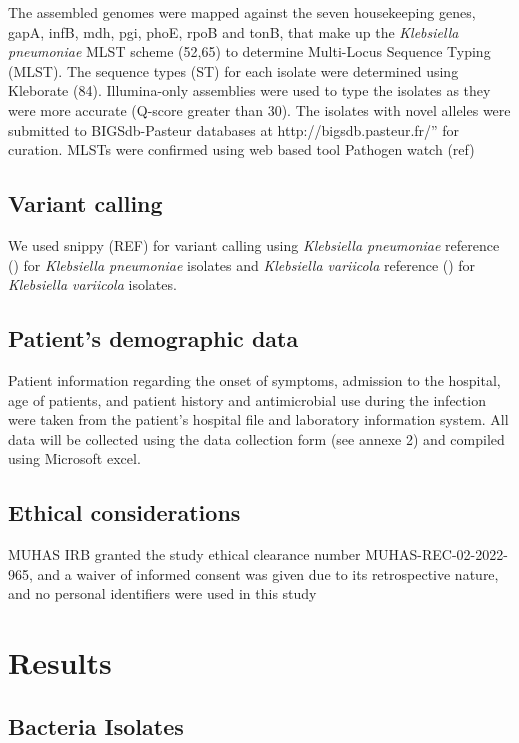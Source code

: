 \documentclass[preprint, 3p,
authoryear]{elsarticle} %
\begin{document}
The assembled genomes were mapped against the seven housekeeping genes,
gapA, infB, mdh, pgi, phoE, rpoB and tonB, that make up the
\emph{Klebsiella pneumoniae} MLST scheme (52,65) to determine
Multi-Locus Sequence Typing (MLST). The sequence types (ST) for each
isolate were determined using Kleborate (84). Illumina-only assemblies
were used to type the isolates as they were more accurate (Q-score
greater than 30). The isolates with novel alleles were submitted to
BIGSdb-Pasteur databases at http://bigsdb.pasteur.fr/'' for curation.
MLSTs were confirmed using web based tool Pathogen watch (ref)

\subsection{Variant calling}\label{variant-calling}

We used snippy (REF) for variant calling using \emph{Klebsiella
pneumoniae} reference () for \emph{Klebsiella pneumoniae} isolates and
\emph{Klebsiella variicola} reference () for \emph{Klebsiella variicola}
isolates.

\subsection{Patient's demographic data}\label{patients-demographic-data}

Patient information regarding the onset of symptoms, admission to the
hospital, age of patients, and patient history and antimicrobial use
during the infection were taken from the patient's hospital file and
laboratory information system. All data will be collected using the data
collection form (see annexe 2) and compiled using Microsoft excel.

\subsection{Ethical considerations}\label{ethical-considerations}

MUHAS IRB granted the study ethical clearance number
MUHAS-REC-02-2022-965, and a waiver of informed consent was given due to
its retrospective nature, and no personal identifiers were used in this
study

\section{Results}\label{results}

\subsection{Bacteria Isolates}\label{bacteria-isolates}
\end{document}
